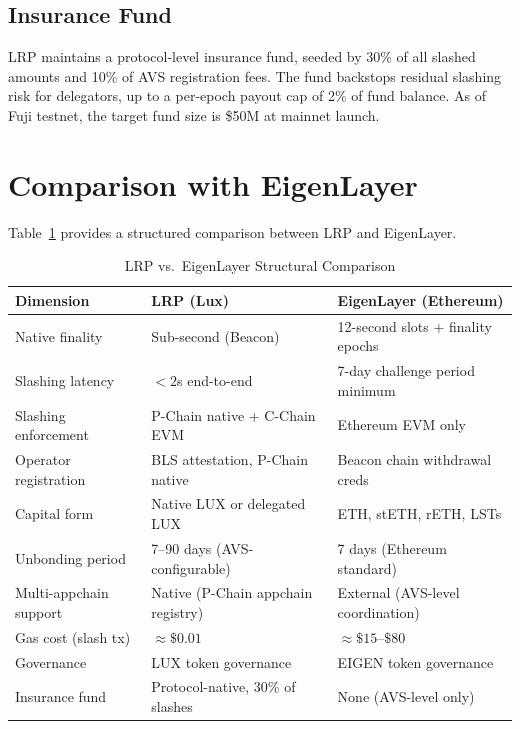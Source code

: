\documentclass[11pt]{article}
\begin{document}
\subsection{Insurance Fund}

LRP maintains a protocol-level insurance fund, seeded by 30\% of all slashed amounts and
10\% of AVS registration fees. The fund backstops residual slashing risk for delegators,
up to a per-epoch payout cap of 2\% of fund balance. As of Fuji testnet, the target fund
size is \$50M at mainnet launch.

\section{Comparison with EigenLayer}
\label{sec:comparison}

Table~\ref{tab:eigenlayer} provides a structured comparison between LRP and EigenLayer.

\begin{table}[H]
\centering
\caption{LRP vs.\ EigenLayer Structural Comparison}
\label{tab:eigenlayer}
\begin{tabular}{p{3.5cm}p{4.5cm}p{4.5cm}}
\toprule
\textbf{Dimension} & \textbf{LRP (Lux)} & \textbf{EigenLayer (Ethereum)} \\
\midrule
Native finality & Sub-second (Beacon) & 12-second slots + finality epochs \\
Slashing latency & $< 2$s end-to-end & 7-day challenge period minimum \\
Slashing enforcement & P-Chain native + C-Chain EVM & Ethereum EVM only \\
Operator registration & BLS attestation, P-Chain native & Beacon chain withdrawal creds \\
Capital form & Native LUX or delegated LUX & ETH, stETH, rETH, LSTs \\
Unbonding period & 7--90 days (AVS-configurable) & 7 days (Ethereum standard) \\
Multi-appchain support & Native (P-Chain appchain registry) & External (AVS-level coordination) \\
Gas cost (slash tx) & $\approx\$0.01$ & $\approx\$15$--$\$80$ \\
Governance & LUX token governance & EIGEN token governance \\
Insurance fund & Protocol-native, 30\% of slashes & None (AVS-level only) \\
\bottomrule
\end{tabular}
\end{table}
\end{document}
